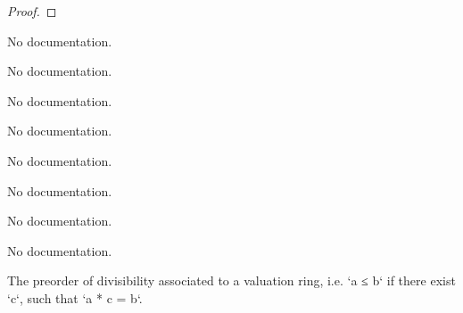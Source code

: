 \begin{proof}
    \leanok
\end{proof}

\begin{definition}\label{ValuationExtension''}
                No documentation.
    \end{definition}

\begin{definition}\label{Valuation.ramificationIndex}
                No documentation.
    \end{definition}

\begin{definition}\label{DiscreteValuation.toInt}
                No documentation.
    \end{definition}

\begin{definition}\label{lowerIndex}
        \leanok
                No documentation.
    \end{definition}

\begin{definition}\label{RamificationGroup}
                No documentation.
    \end{definition}

\begin{theorem}\label{lower_numbering_inf}
                No documentation.
    \end{theorem}

\begin{theorem}\label{index_subgroup}
                No documentation.
    \end{theorem}

\begin{theorem}\label{index_quotient_group}
                No documentation.
    \end{theorem}

\begin{definition}\label{ValuationRingTopology.ValuationRing.setoid}
                The preorder of divisibility associated to a valuation ring, i.e. `a ≤ b` if there exist `c`, such that `a * c = b`.
    \end{definition}

